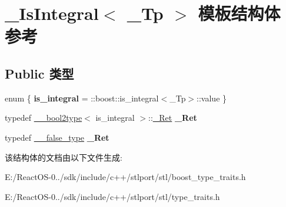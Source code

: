 \hypertarget{struct___is_integral}{}\section{\+\_\+\+Is\+Integral$<$ \+\_\+\+Tp $>$ 模板结构体 参考}
\label{struct___is_integral}
\subsection*{Public 类型}
\begin{DoxyCompactItemize}
\item 
\mbox{\label{struct___is_integral_aef4342007e432782f2c335c3cc7a5ff5}} 
enum \{ {\bfseries is\+\_\+integral} = \+:\+:boost\+:\+:is\+\_\+integral$<$\+\_\+\+Tp$>$\+:\+:value
 \}
\item 
\mbox{\label{struct___is_integral_a31d0b9cb7d3862c9a826fbbe914114fb}} 
typedef \hyperlink{struct____bool2type}{\+\_\+\+\_\+bool2type}$<$ is\+\_\+integral $>$\+::\hyperlink{struct____true__type}{\+\_\+\+Ret} {\bfseries \+\_\+\+Ret}
\item 
\mbox{\label{struct___is_integral_ad086035dc38274898220d4ac2e79dd93}} 
typedef \hyperlink{struct____false__type}{\+\_\+\+\_\+false\+\_\+type} {\bfseries \+\_\+\+Ret}
\end{DoxyCompactItemize}


该结构体的文档由以下文件生成\+:\begin{DoxyCompactItemize}
\item 
E\+:/\+React\+O\+S-\/0../sdk/include/c++/stlport/stl/boost\+\_\+type\+\_\+traits.\+h\item 
E\+:/\+React\+O\+S-\/0../sdk/include/c++/stlport/stl/type\+\_\+traits.\+h\end{DoxyCompactItemize}
